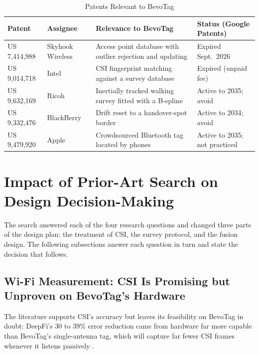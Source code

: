 \documentclass[12pt,letterpaper]{article}
\newenvironment{spectable}{\setstretch{1.0}\renewcommand{\arraystretch}{1.1}}{}
\begin{document}
\begin{table}[!htb]
\caption{Patents Relevant to BevoTag}
\label{tab:pat}
\centering
\begin{spectable}
\begin{tabularx}{\linewidth}{@{}L{1.05in} L{1.0in} Y L{1.2in}@{}}
\toprule
\textbf{Patent} & \textbf{Assignee} & \textbf{Relevance to BevoTag} & \textbf{Status (Google Patents)} \\
\midrule
US 7,414,988 \cite{skyhook} & Skyhook Wireless & Access point database with outlier rejection and updating & Expired Sept.~2026 \\ \addlinespace
US 9,014,718 \cite{intel} & Intel & CSI fingerprint matching against a survey database & Expired (unpaid fee) \\ \addlinespace
US 9,632,169 \cite{ricoh} & Ricoh & Inertially tracked walking survey fitted with a B-spline & Active to 2035; avoid \\ \addlinespace
US 9,332,476 \cite{blackberry} & BlackBerry & Drift reset to a handover-spot border & Active to 2034; avoid \\ \addlinespace
US 9,479,920 \cite{apple} & Apple & Crowdsourced Bluetooth tag located by phones & Active to 2035; not practiced \\
\bottomrule
\end{tabularx}
\end{spectable}
\end{table}

\section{Impact of Prior-Art Search on Design Decision-Making}
The search answered each of the four research questions and changed three parts of the design
plan: the treatment of CSI, the survey protocol, and the fusion design. The following subsections
answer each question in turn and state the decision that follows.

\subsection{Wi-Fi Measurement: CSI Is Promising but Unproven on BevoTag's Hardware}
The literature supports CSI's accuracy but leaves its feasibility on BevoTag in doubt: DeepFi's 30
to 39\% error reduction \cite{deepfi} came from hardware far more capable than BevoTag's
single-antenna tag, which will capture far fewer CSI frames whenever it listens passively
\cite{esp32tool}.
\end{document}
